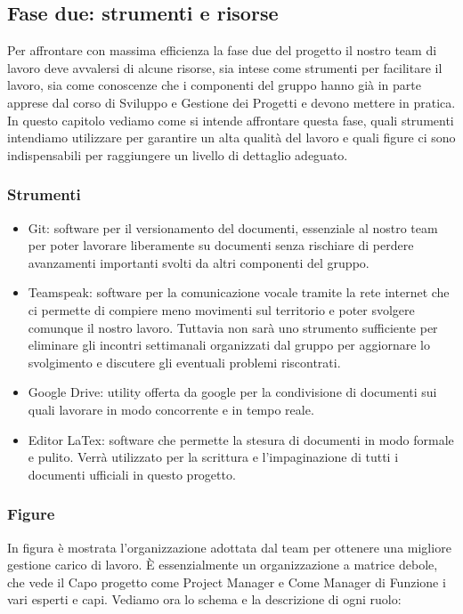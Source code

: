 \newpage

\subsection{Fase due: strumenti e risorse}
Per affrontare con massima efficienza la fase due del progetto il nostro team di lavoro deve avvalersi di alcune risorse, sia intese come strumenti per facilitare il lavoro, sia come conoscenze che i componenti del gruppo hanno già in parte apprese dal corso di Sviluppo e Gestione dei Progetti e devono mettere in pratica. In questo capitolo vediamo come si intende affrontare questa fase, quali strumenti intendiamo utilizzare per garantire un alta qualità del lavoro e quali figure ci sono indispensabili per raggiungere un livello di dettaglio adeguato.

\subsubsection{Strumenti}
\begin{itemize}
\item Git: software per il versionamento del documenti, essenziale al nostro team per poter lavorare liberamente su documenti senza rischiare di perdere avanzamenti importanti svolti da altri componenti del gruppo.
\item Teamspeak: software per la comunicazione vocale tramite la rete internet che ci permette di compiere meno movimenti sul territorio e poter svolgere comunque il nostro lavoro. Tuttavia non sarà uno strumento sufficiente per eliminare gli incontri settimanali organizzati dal gruppo per aggiornare lo svolgimento e discutere gli eventuali problemi riscontrati.
\item Google Drive: utility offerta da google per la condivisione di documenti sui quali lavorare in modo concorrente e in tempo reale.
\item Editor LaTex: software che permette la stesura di documenti in modo formale e pulito. Verrà utilizzato per la scrittura e l'impaginazione di tutti i documenti ufficiali in questo progetto.
\end{itemize}

\subsubsection{Figure}
In figura  è mostrata l'organizzazione adottata dal team per ottenere una migliore gestione carico di lavoro. È essenzialmente un organizzazione a matrice debole, che vede il Capo progetto come Project Manager e Come Manager di Funzione i vari esperti e capi. Vediamo ora lo schema e la descrizione di ogni ruolo:

